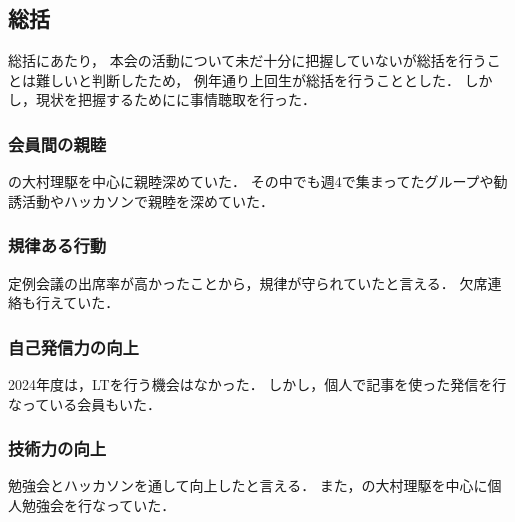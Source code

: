 \subsection*{\firstGrade{}総括}



\firstGrade{}総括にあたり，
本会の活動について未だ十分に把握していない\firstGrade{}が総括を行うことは難しいと判断したため，
例年通り上回生が総括を行うこととした．
しかし，現状を把握するために\firstGrade{}に事情聴取を行った．

\subsubsection*{会員間の親睦}
\firstGrade{}の大村理駆を中心に親睦深めていた．
その中でも週4で集まってたグループや勧誘活動やハッカソンで親睦を深めていた．


\subsubsection*{規律ある行動}
定例会議の出席率が高かったことから，規律が守られていたと言える．
欠席連絡も行えていた．

\subsubsection*{自己発信力の向上}
2024年度は，LTを行う機会はなかった．
しかし，個人で記事を使った発信を行なっている会員もいた．

\subsubsection*{技術力の向上}
勉強会とハッカソンを通して向上したと言える．
また，\firstGrade{}の大村理駆を中心に個人勉強会を行なっていた．
